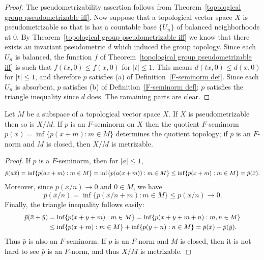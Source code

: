 \begin{proof}
The pseudometrizability assertion follows from Theorem~\ref{topological group pseudometrizable iff}. Now suppose that a topological vector space $X$ is pseudometrizable so that is has a countable base $\{U_n\}$ of balanced neighborhoods at $0$. By Theorem~\ref{topological group pseudometrizable iff} we know that there exists an invariant pseudometric $d$ which induced the group topology. Since each $U_n$ is balanced, the function $f$ of Theorem~\ref{topological group pseudometrizable iff} is such that $f(tx,0)\leq f(x,0)$ for $|t|\leq 1$. This means $d(tx,0)\leq d(x,0)$ for $|t|\leq 1$, and therefore $p$ satisfies (a) of Definition~\ref{F-seminorm def}. Since each $U_n$ is absorbent, $p$ satisfies (b) of Definition~\ref{F-seminorm def}; $p$ satisfies the triangle inequality since $d$ does. The ramaining parts are clear.
\end{proof}
\begin{corollary}
Let $M$ be a subspace of a topological vector space $X$. If $X$ is pseudometrizable then so is $X/M$. If $p$ is an $F$-seminorm on $X$ then the quotient $F$-seminorm $\bar{p}(\bar{x})=\inf\{p(x+m):m\in M\}$ determines the quotient topology; if $p$ is an $F$-norm and $M$ is closed, then $X/M$ is metrizable. 
\end{corollary}
\begin{proof}
If $p$ is a $F$-seminorm, then for $|a|\leq 1$,
\begin{equation*}\small
\begin{aligned}
\bar{p}(a\bar{x})=\inf\{p(ax+m):m\in M\}=\inf\{p(a(x+m)):m\in M\}\leq\inf\{p(x+m):m\in M\}=\bar{p}(\bar{x}).
\end{aligned}
\end{equation*}
Moreover, since $p(x/n)\to 0$ and $0\in M$, we have
\[\bar{p}(\bar{x}/n)=\inf\{p(x/n+m):m\in M\}\leq p(x/n)\to 0.\]
Finally, the triangle inequality follows easily:
\begin{equation*}\small
\begin{aligned}
\bar{p}(\bar{x}+\bar{y})&=\inf\{p(x+y+m):m\in M\}=\inf\{p(x+y+m+n):m,n\in M\}\\
&\leq\inf\{p(x+m):m\in M\}+\inf\{p(y+n):n\in M\}=\bar{p}(\bar{x})+\bar{p}(\bar{y}).
\end{aligned}
\end{equation*}
Thus $\bar{p}$ is also an $F$-seminorm. If $p$ is an $F$-norm and $M$ is closed, then it is not hard to see $\bar{p}$ is an $F$-norm, and thus $X/M$ is metrizable.
\end{proof}
